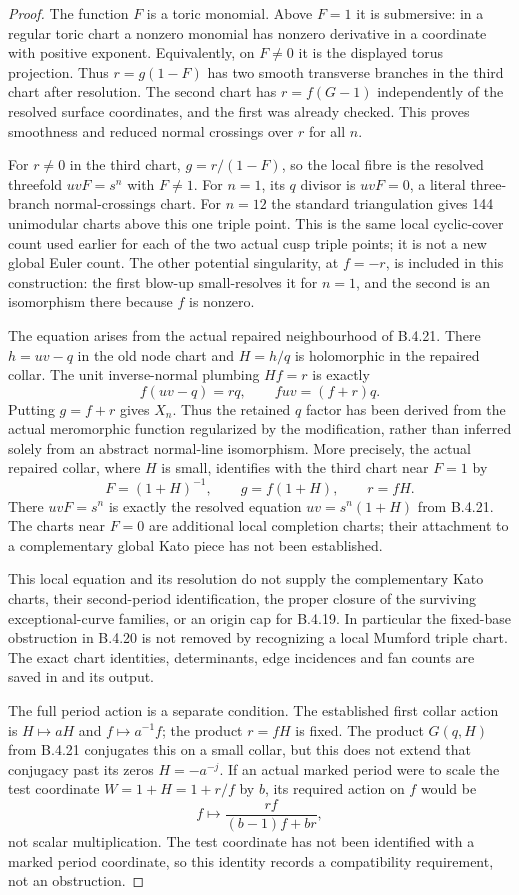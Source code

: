 \begin{proof}
The function $F$ is a toric monomial. Above $F=1$
it is submersive: in a regular toric chart a
nonzero monomial has nonzero derivative in a
coordinate with positive exponent. Equivalently,
on $F\ne0$ it is the displayed torus projection.
Thus $r=g(1-F)$ has two smooth transverse
branches in the third chart after resolution.
The second chart has $r=f(G-1)$ independently
of the resolved surface coordinates, and the
first was already checked. This proves smoothness
and reduced normal crossings over $r$ for all $n$.

For $r\ne0$ in the third chart,
$g=r/(1-F)$, so the local fibre is the resolved
threefold $uvF=s^n$ with $F\ne1$.
For $n=1$, its $q$ divisor is $uvF=0$, a literal
three-branch normal-crossings chart. For $n=12$
the standard triangulation gives 144 unimodular
charts above this one triple point. This is the
same local cyclic-cover count used earlier for
each of the two actual cusp triple points; it
is not a new global Euler count. The other
potential singularity, at $f=-r$, is included
in this construction: the first blow-up small-resolves it
for $n=1$, and the second is an isomorphism there
because $f$ is nonzero.

The equation arises from the actual repaired
neighbourhood of B.4.21. There $h=uv-q$ in the
old node chart and $H=h/q$ is holomorphic in the
repaired collar. The unit inverse-normal plumbing
$Hf=r$ is exactly
\[
 f(uv-q)=rq,
 \qquad fuv=(f+r)q.
\]
Putting $g=f+r$ gives $X_n$. Thus the retained
$q$ factor has been derived from the actual
meromorphic function regularized by the
modification, rather than inferred solely from
an abstract normal-line isomorphism.
More precisely, the actual repaired collar, where $H$ is small,
identifies with the third chart near $F=1$ by
\[
 F=(1+H)^{-1},\qquad g=f(1+H),\qquad r=fH.
\]
There $uvF=s^n$ is exactly the resolved equation
$uv=s^n(1+H)$ from B.4.21. The charts near $F=0$
are additional local completion charts; their attachment
to a complementary global Kato piece has not been established.

This local equation and its resolution do not
supply the complementary Kato charts, their
second-period identification, the proper closure
of the surviving exceptional-curve families, or
an origin cap for B.4.19. In particular the
fixed-base obstruction in B.4.20 is not removed
by recognizing a local Mumford triple chart.
The exact chart identities, determinants, edge
incidences and fan counts are saved in
 and its
output.

The full period action is a separate condition. The established
first collar action is $H\mapsto aH$ and $f\mapsto a^{-1}f$;
the product $r=fH$ is fixed. The product $G(q,H)$ from B.4.21
conjugates this on a small collar, but this does not extend that
conjugacy past its zeros $H=-a^{-j}$. If an actual marked period
were to scale the test coordinate $W=1+H=1+r/f$ by $b$, its
required action on $f$ would be
\[
 f\longmapsto\frac{rf}{(b-1)f+br},
\]
not scalar multiplication. The test coordinate has not been
identified with a marked period coordinate, so this identity
records a compatibility requirement, not an obstruction.
\end{proof}
